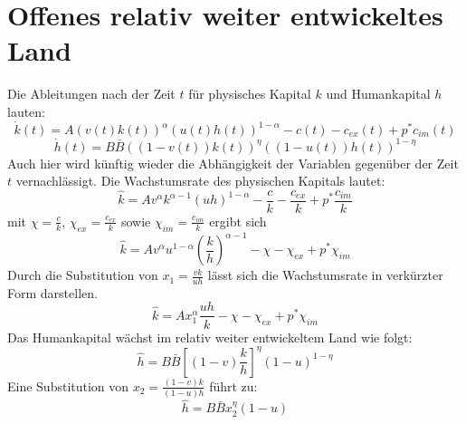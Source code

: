 \section[Offenes relativ weiter entwickeltes Land]{Offenes relativ weiter entwickeltes Land }\label{APPENDIXIL}
Die Ableitungen nach der Zeit $t$ für physisches Kapital $k$ und Humankapital $h$ lauten:
\begin{equation}
\dot{k}(t)=A(v(t)k(t))^\alpha(u(t)h(t))^{1-\alpha}-c(t)-c_{ex}(t)+p^*c_{im}(t)
\end{equation}
\vspace{-0.7cm}
\begin{equation}
\dot{h}(t)=B\bar{B}((1-v(t))k(t))^{\eta}((1-u(t))h(t))^{1-\eta}
\end{equation}
Auch hier wird künftig wieder die Abhängigkeit der Variablen gegenüber der Zeit $t$ vernachlässigt. Die Wachstumsrate des physischen Kapitals lautet: 
\begin{equation*}
\hat{k}=Av^\alpha k^{\alpha-1}(uh)^{1-\alpha}-\frac{c}{k}-\frac{c_{ex}}{k}+p^*\frac{c_{im}}{k}
\end{equation*}
mit $\chi=\frac{c}{k}$, $\chi_{ex}=\frac{c_{ex}}{k}$ sowie $\chi_{im}=\frac{c_{im}}{k}$ ergibt sich
\begin{equation}
\hat{k}=Av^\alpha u^{1-\alpha}\left(\frac{k}{h}\right)^{\alpha-1}-\chi-\chi_{ex}+p^*\chi_{im}
\end{equation}
Durch die Substitution von $x_1=\frac{vk}{uh}$ lässt sich die Wachstumsrate in verkürzter Form darstellen. 
\begin{equation}
\boxed{\hat{k}=Ax_1^\alpha \frac{uh}{k}-\chi-\chi_{ex}+p^*\chi_{im}}
\end{equation}
Das Humankapital wächst im relativ weiter entwickeltem Land wie folgt: 
\begin{equation}
\hat{h}=B\bar{B}\left[(1-v)\frac{k}{h}\right]^{\eta}(1-u)^{1-\eta}
\end{equation}
Eine Substitution von $x_2=\frac{(1-v)k}{(1-u)h}$ führt zu: 
\begin{equation}
\boxed{\hat{h}=B\bar{B}x_2^\eta(1-u)}
\end{equation}
